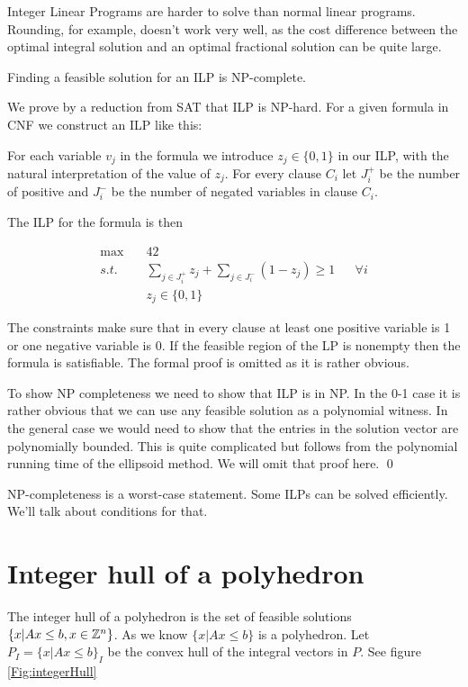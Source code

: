 Integer Linear Programs are harder to solve than normal linear programs. Rounding, for example, doesn't work very well, as the cost difference between the optimal integral solution and an optimal fractional solution can be quite large.

\begin{thm} Finding a feasible solution for an ILP is NP-complete.
\end{thm}

\begin{pr} We prove by a reduction from SAT that ILP is NP-hard. For a given formula in CNF we construct an ILP like this:

For each variable $v_j$ in the formula we introduce $z_j \in \{0,1\}$ in our ILP, with the natural interpretation of the value of $z_j$. For every clause $C_i$ let $J^+_i$ be the number of positive and $J^-_i$ be the number of negated variables in clause $C_i$.

The ILP for the formula is then

\begin{align*}
\max \quad & 42 \\
s.t. &\sum_{j\in J^+_i} z_j + \sum_{j\in J^-_i} (1-z_j) \geq 1 && \forall i\\
&z_j \in \{0,1\}
\end{align*}

The constraints make sure that in every clause at least one positive variable is 1 or one negative variable is 0. If the feasible region of the LP is nonempty then the formula is satisfiable. The formal proof is omitted as it is rather obvious.

To show NP completeness we need to show that ILP is in NP. In the 0-1 case it is rather obvious that we can use any feasible solution as a polynomial witness. In the general case we would need to show that the entries in the solution vector are polynomially bounded. This is quite complicated but follows from the polynomial running time of the ellipsoid method. We will omit that proof here.
\qed \end{pr}

NP-completeness is a worst-case statement. Some ILPs can be solved efficiently. We'll talk about conditions for that.

\section{Integer hull of a polyhedron}

The integer hull of a polyhedron is the set of feasible solutions $\{x | Ax\leq b, x\in \mathbb{Z}^n\}$. As we know $\{x|Ax\leq b\}$ is a polyhedron. Let $P_I = \{x| Ax\leq b\}_I$ be the convex hull of the integral vectors in $P$. See figure \ref{Fig:integerHull}


